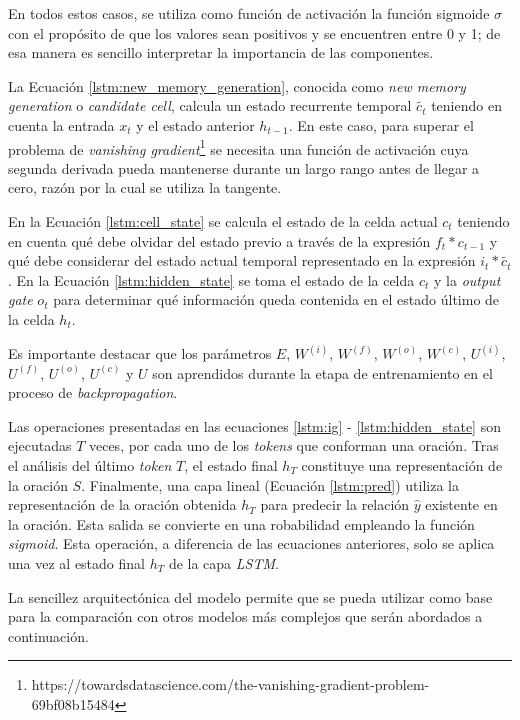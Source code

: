 En todos estos casos, se utiliza como función de activación la función sigmoide $\sigma$ con el propósito de que los valores sean positivos y se encuentren entre 0 y 1; de esa manera es sencillo interpretar la importancia de las componentes.

La Ecuación \ref{lstm:new_memory_generation}, conocida como \textit{new memory generation} o \textit{candidate cell}, calcula un estado recurrente temporal $\tilde{c_{t}}$ teniendo en cuenta la entrada $x_{t}$ y el estado anterior $h_{t-1}$. En este caso, para superar el problema de \textit{vanishing gradient}\footnote{https://towardsdatascience.com/the-vanishing-gradient-problem-69bf08b15484} se necesita una función de activación cuya segunda derivada pueda mantenerse durante un largo rango antes de llegar a cero, razón por la cual se utiliza la tangente.

En la Ecuación \ref{lstm:cell_state} se calcula el estado de la celda actual $c_{t}$ teniendo en cuenta qué debe olvidar del estado previo a través de la expresión $f_{t}*c_{t-1}$ y qué debe considerar del estado actual temporal representado en la expresión $i_{t}*\tilde{c_{t}}$. En la Ecuación \ref{lstm:hidden_state} se toma el estado de la celda $c_{t}$ y la \textit{output gate} $o_{t}$ para determinar qué información queda contenida en el estado último de la celda $h_{t}$.

Es importante destacar que los parámetros $E$, $W^{(i)}$, $W^{(f)}$, $W^{(o)}$, $W^{(c)}$, $U^{(i)}$, $U^{(f)}$, $U^{(o)}$, $U^{(c)}$ y $U$ son aprendidos durante la etapa de entrenamiento en el proceso de \textit{backpropagation}.

Las operaciones presentadas en las ecuaciones \ref{lstm:ig} - \ref{lstm:hidden_state} son ejecutadas $T$ veces, por cada uno de los \textit{tokens} que conforman una oración. Tras el análisis del último \textit{token} $T$, el estado final $h_{T}$ constituye una representación de la oración $S$. Finalmente, una capa lineal (Ecuación \ref{lstm:pred}) utiliza la representación de la oración obtenida $h_{T}$ para predecir la relación $\hat{y}$ existente en la oración. Esta salida se convierte en una robabilidad empleando la función \textit{sigmoid}. Esta operación, a diferencia de las ecuaciones anteriores, solo se aplica una vez al estado final $h_{T}$ de la capa \textit{LSTM}.

La sencillez arquitectónica del modelo permite que se pueda utilizar como base para la comparación con otros modelos más complejos que serán abordados a continuación.

